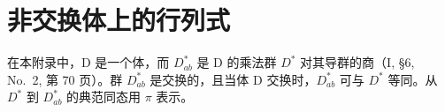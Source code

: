 \chapter{非交换体上的行列式}

在本附录中，D 是一个体，而 \(D_{ab}^{*}\) 是 D 的乘法群 \(D^{*}\) 对其导群的商（I, §6, No.~2, 第 70 页）。群 \(D_{ab}^{*}\) 是交换的，且当体 D 交换时，\(D_{ab}^{*}\) 可与 \(D^{*}\) 等同。从 \(D^{*}\) 到 \(D_{ab}^{*}\) 的典范同态用 \(\pi\) 表示。

